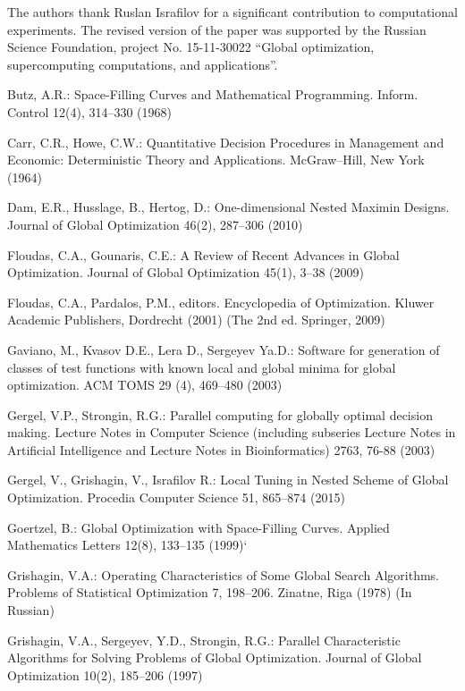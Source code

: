 \documentclass[smallextended]{svjour3}
\begin{document}
\begin{acknowledgements}
The authors thank Ruslan Israfilov for a significant contribution to computational experiments. The revised version of the paper was supported by the Russian Science Foundation, project  No. 15-11-30022 ``Global optimization, supercomputing computations, and applications''.
\end{acknowledgements}


\begin{thebibliography}{}
Butz, A.R.: Space-Filling Curves and Mathematical Programming. Inform. Control 12(4), 314--330 (1968)

Carr, C.R., Howe, C.W.: Quantitative Decision Procedures in Management and Economic: Deterministic Theory and Applications. McGraw–Hill, New York (1964)

Dam, E.R., Husslage, B., Hertog, D.: One-dimensional Nested Maximin Designs. Journal of Global Optimization 46(2), 287--306 (2010)

Floudas, C.A., Gounaris, C.E.: A Review of Recent Advances in Global Optimization. Journal of Global Optimization 45(1), 3--38 (2009)

Floudas, C.A., Pardalos, P.M., editors. Encyclopedia of Optimization. Kluwer Academic Publishers, Dordrecht (2001) (The 2nd ed. Springer, 2009)

Gaviano, M., Kvasov D.E., Lera D., Sergeyev Ya.D.: Software for generation of classes of test functions with known local and global minima for global optimization. ACM TOMS 29 (4), 469--480 (2003)

Gergel, V.P., Strongin, R.G.: Parallel computing for globally optimal decision making. Lecture Notes in Computer Science (including subseries Lecture Notes in Artificial Intelligence and Lecture Notes in Bioinformatics) 2763, 76-88 (2003)

Gergel, V., Grishagin, V., Israfilov R.: Local Tuning in Nested Scheme of Global Optimization. Procedia Computer Science 51, 865–874 (2015)

Goertzel, B.: Global Optimization with Space-Filling Curves. Applied Mathematics Letters 12(8), 133--135 (1999)`

Grishagin, V.A.: Operating Characteristics of Some Global Search Algorithms. Problems of Statistical Optimization 7, 198--206. Zinatne, Riga (1978) (In Russian)

Grishagin, V.A., Sergeyev, Y.D., Strongin, R.G.: Parallel Characteristic Algorithms for Solving Problems of Global Optimization. Journal of Global Optimization 10(2), 185--206 (1997)


\end{thebibliography}
\end{document}
